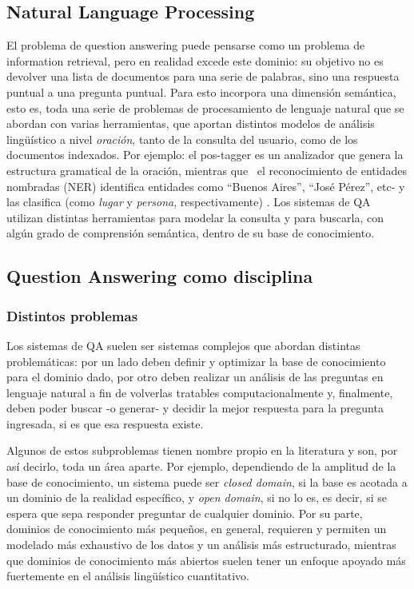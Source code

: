 \subsection{Natural Language Processing}

El problema de question answering puede pensarse como un problema de information
retrieval, pero en realidad excede este dominio: su objetivo no es devolver una lista de documentos para
una serie de palabras, sino una respuesta puntual a una pregunta
puntual. Para esto incorpora una dimensión semántica, esto es, toda
una serie de problemas de procesamiento de lenguaje natural que se
abordan con varias herramientas, que aportan distintos modelos de
análisis lingüístico a nivel \textit{oración}, tanto de la
consulta del usuario, como de los documentos indexados. Por ejemplo: el
pos-tagger es un analizador que genera la estructura gramatical de la
oración, mientras que \ el reconocimiento de entidades nombradas
(NER) identifica entidades como {\textquotedblleft}Buenos
Aires{\textquotedblright}, {\textquotedblleft}José
Pérez{\textquotedblright}, etc- y las clasifica (como \textit{lugar}
y \textit{persona}, respectivamente) . Los sistemas de QA utilizan
distintas herramientas para modelar la consulta y para buscarla, con
algún grado de comprensión semántica, dentro de su base de
conocimiento.


\bigskip

\subsection{Question Answering como disciplina}

\subsubsection{Distintos problemas}

Los sistemas de QA suelen ser sistemas complejos que abordan distintas
problemáticas: por un lado deben definir y optimizar la base de
conocimiento para el dominio dado, por otro deben realizar un
análisis de las preguntas en lenguaje natural a fin de volverlas
tratables computacionalmente y, finalmente, deben poder buscar -o generar- y
decidir la mejor respuesta para la pregunta ingresada, si es que esa
respuesta existe.


\bigskip

Algunos de estos subproblemas tienen nombre propio en la literatura y son, por así decirlo, toda un área aparte. Por
ejemplo, dependiendo de la amplitud de la base de conocimiento, un
sistema puede ser \textit{closed domain}, si la base es acotada a un dominio de la realidad específico, y
\textit{open domain}, si no lo es, es decir, si se espera que sepa responder preguntar de cualquier dominio.
Por su parte, dominios de conocimiento más pequeños, en general, requieren y permiten un modelado más exhaustivo
de los datos y un análisis más estructurado, mientras que dominios de conocimiento más abiertos suelen
tener un enfoque apoyado más fuertemente en el análisis lingüístico cuantitativo.


